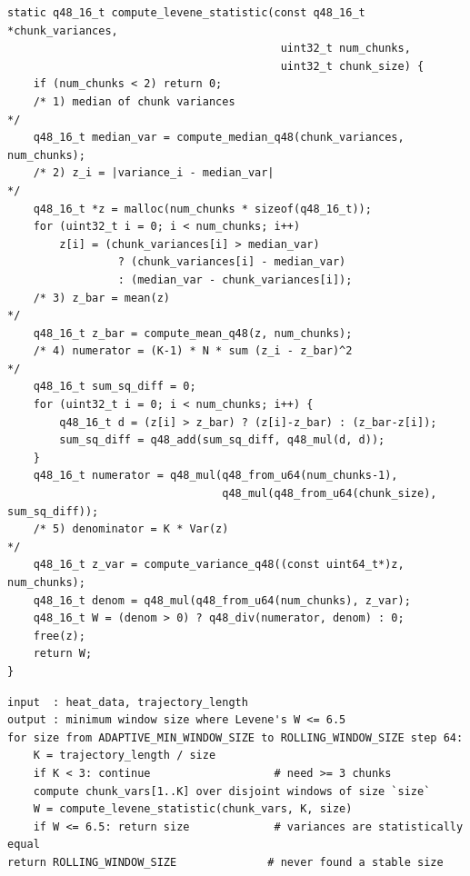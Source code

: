 \documentclass[11pt,letterpaper,openany]{book}
\theoremstyle{definition}
\theoremstyle{plain}
\begin{document}
\begin{lstlisting}[caption={Levene implementation
  (\texttt{src/inference\_engine.c}:302--349).}]
static q48_16_t compute_levene_statistic(const q48_16_t *chunk_variances,
                                          uint32_t num_chunks,
                                          uint32_t chunk_size) {
    if (num_chunks < 2) return 0;
    /* 1) median of chunk variances                                   */
    q48_16_t median_var = compute_median_q48(chunk_variances, num_chunks);
    /* 2) z_i = |variance_i - median_var|                             */
    q48_16_t *z = malloc(num_chunks * sizeof(q48_16_t));
    for (uint32_t i = 0; i < num_chunks; i++)
        z[i] = (chunk_variances[i] > median_var)
                 ? (chunk_variances[i] - median_var)
                 : (median_var - chunk_variances[i]);
    /* 3) z_bar = mean(z)                                              */
    q48_16_t z_bar = compute_mean_q48(z, num_chunks);
    /* 4) numerator = (K-1) * N * sum (z_i - z_bar)^2                 */
    q48_16_t sum_sq_diff = 0;
    for (uint32_t i = 0; i < num_chunks; i++) {
        q48_16_t d = (z[i] > z_bar) ? (z[i]-z_bar) : (z_bar-z[i]);
        sum_sq_diff = q48_add(sum_sq_diff, q48_mul(d, d));
    }
    q48_16_t numerator = q48_mul(q48_from_u64(num_chunks-1),
                                 q48_mul(q48_from_u64(chunk_size), sum_sq_diff));
    /* 5) denominator = K * Var(z)                                     */
    q48_16_t z_var = compute_variance_q48((const uint64_t*)z, num_chunks);
    q48_16_t denom = q48_mul(q48_from_u64(num_chunks), z_var);
    q48_16_t W = (denom > 0) ? q48_div(numerator, denom) : 0;
    free(z);
    return W;
}
\end{lstlisting}

\begin{algorithm}[H]
\caption{Variance-inflection scan (\texttt{find\_variance\_inflection()},
  \texttt{src/inference\_engine.c}:351--436).}\label{alg:inflection}
\begin{lstlisting}[basicstyle=\ttfamily\footnotesize]
input  : heat_data, trajectory_length
output : minimum window size where Levene's W <= 6.5
for size from ADAPTIVE_MIN_WINDOW_SIZE to ROLLING_WINDOW_SIZE step 64:
    K = trajectory_length / size
    if K < 3: continue                   # need >= 3 chunks
    compute chunk_vars[1..K] over disjoint windows of size `size`
    W = compute_levene_statistic(chunk_vars, K, size)
    if W <= 6.5: return size             # variances are statistically equal
return ROLLING_WINDOW_SIZE              # never found a stable size
\end{lstlisting}
\end{algorithm}
\end{document}
